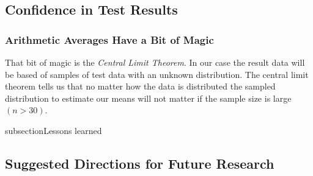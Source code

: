 \subsection{Confidence in Test Results}
\subsubsection{Arithmetic Averages Have a Bit of Magic}
That bit of magic is the \emph{Central Limit Theorem}. In our case the result data will be based of samples of test data with an unknown distribution. The central limit theorem tells us that no matter how the data is distributed the sampled distribution to estimate our means will not matter if the sample size is large $(n > 30)$.

subsection{Lessons learned}
\subsection{Suggested Directions for Future Research}